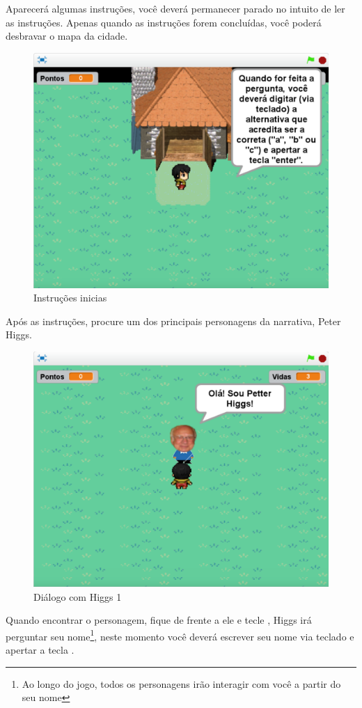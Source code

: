 \documentclass[12pt,fleqn]{book} %
\begin{document}
\newpage

Aparecerá algumas instruções, você deverá permanecer parado no intuito de ler as instruções. Apenas quando as instruções forem concluídas, você poderá desbravar o mapa da cidade. 

\begin{figure}[h]
	\centering
	\includegraphics[width=0.65 \textwidth]{Produto/jogo_2}
	\caption{Instruções inicias}
	\label{fig:app_a:jogo2}
\end{figure}

Após as instruções, procure um dos principais personagens da narrativa, Peter Higgs.

\begin{figure}[h]
	\centering
	\includegraphics[width=0.65 \textwidth]{Produto/jogo_3}
	\caption{Diálogo com Higgs 1}
	\label{fig:app_a:jogo3}
\end{figure}

\newpage

Quando encontrar o personagem, fique de frente a ele e tecle , Higgs irá perguntar seu nome\footnote{Ao longo do jogo, todos os personagens irão interagir com você a partir do seu nome}, neste momento você deverá escrever seu nome via teclado e apertar a tecla .
\end{document}
